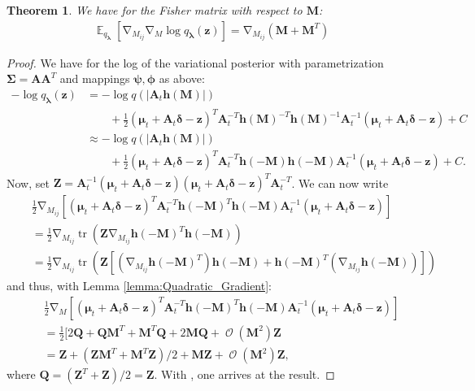 \documentclass[a4paper, 11pt, oneside]{scrartcl}
\theoremstyle{break}
\newtheorem{theorem}[lemma]{Theorem}
\DeclareMathOperator{\tr}{tr}
\DeclareMathOperator{\Expect}{\mathbb{E}}
\DeclareMathOperator{\grad}{\nabla}
\DeclareMathOperator{\BigO}{\mathcal{O}}
\newcommand{\matr}[1]{\boldsymbol{#1}}
\numberwithin{equation}{section}
\begin{document}
				\begin{theorem}
					We have for the Fisher matrix with respect to $\matr{M}$:
					\begin{align*}
						\Expect_{q_{\matr{\lambda}}} [\grad_{M_{ij}} \grad_M \log q_{\matr{\lambda}} (\matr{z})] = \grad_{M_{ij}} (\matr{M} + \matr{M}^T)
					\end{align*}
				\end{theorem}

				\begin{proof}
					We have for the log of the variational posterior with parametrization $\matr{\Sigma} = \matr{A} \matr{A}^T$ and mappings $\matr{\psi}, \matr{\phi}$ as above:
					\begin{align*}
						-\log q_{\matr{\lambda}} (\matr{z}) &= -\log q (|\matr{A}_t \matr{h} (\matr{M})|) \\
						&\qquad + \frac{1}{2} (\matr{\mu}_t + \matr{A}_t \matr{\delta} - \matr{z})^T \matr{A}_t^{-T} \matr{h}(\matr{M})^{-T} \matr{h}(\matr{M})^{-1} \matr{A}_t^{-1} (\matr{\mu}_t + \matr{A}_t \matr{\delta} - \matr{z}) + C \\
						&\approx -\log q (|\matr{A}_t \matr{h} (\matr{M})|) \\
						&\qquad +  \frac{1}{2} (\matr{\mu}_t + \matr{A}_t \matr{\delta} - \matr{z})^T \matr{A}_t^{-T} \matr{h}(-\matr{M}) \matr{h}(-\matr{M}) \matr{A}_t^{-1} (\matr{\mu}_t + \matr{A}_t \matr{\delta} - \matr{z}) + C.
					\end{align*}
					Now, set $\matr{Z} = \matr{A}_t^{-1} (\matr{\mu}_t + \matr{A}_t \matr{\delta} - \matr{z}) (\matr{\mu}_t + \matr{A}_t \matr{\delta} - \matr{z})^T \matr{A}_t^{-T}$.
					We can now write
					\begin{align*}
						\quad& \frac{1}{2} \grad_{M_{ij}} [ (\matr{\mu}_t + \matr{A}_t \matr{\delta} - \matr{z})^T \matr{A}_t^{-T} \matr{h}(-\matr{M})^T \matr{h}(-\matr{M}) \matr{A}_t^{-1} (\matr{\mu}_t + \matr{A}_t \matr{\delta} - \matr{z}) ] \\
						&= \frac{1}{2} \grad_{M_{ij}} \tr (\matr{Z} \grad_{M_{ij}} \matr{h}(-\matr{M})^T \matr{h}(-\matr{M})) \\
						&= \frac{1}{2} \grad_{M_{ij}} \tr (\matr{Z} [(\grad_{M_{ij}} \matr{h}(-\matr{M})^T) \matr{h}(-\matr{M}) + \matr{h}(-\matr{M})^T (\grad_{M_{ij}} \matr{h}(-\matr{M}))])
					\end{align*}
					and thus, with Lemma \ref{lemma:Quadratic_Gradient}:
					\begin{align*}
						\quad& \frac{1}{2} \grad_M [ (\matr{\mu}_t + \matr{A}_t \matr{\delta} - \matr{z})^T \matr{A}_t^{-T} \matr{h}(-\matr{M})^T \matr{h}(-\matr{M}) \matr{A}_t^{-1} (\matr{\mu}_t + \matr{A}_t \matr{\delta} - \matr{z}) ] \\
						&= \frac{1}{2} [2 \matr{Q} + \matr{Q} \matr{M}^T + \matr{M}^T \matr{Q} + 2 \matr{M} \matr{Q} + \BigO(\matr{M}^2) \matr{Z} \\
						&= \matr{Z} + (\matr{Z} \matr{M}^T + \matr{M}^T \matr{Z}) / 2 + \matr{M} \matr{Z} + \BigO(\matr{M}^2) \matr{Z},
					\end{align*}
					where $\matr{Q} = (\matr{Z}^T + \matr{Z})/2 = \matr{Z}$.
					With \parencite[Lemma 11]{LNK+21}, one arrives at the result.
				\end{proof}
\end{document}
